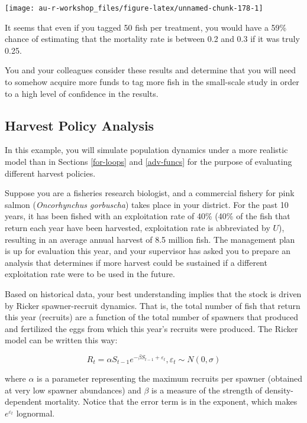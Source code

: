 \documentclass[]{book}
\theoremstyle{definition}
\theoremstyle{definition}
\theoremstyle{definition}
\theoremstyle{remark}
\begin{document}
\begin{center}\texttt{[image: au-r-workshop\_files/figure-latex/unnamed-chunk-178-1]} \end{center}

It seems that even if you tagged 50 fish per treatment, you would have a
59\% chance of estimating that the mortality rate is between 0.2 and 0.3
if it was truly 0.25.

You and your colleagues consider these results and determine that you
will need to somehow acquire more funds to tag more fish in the
small-scale study in order to a high level of confidence in the results.

\subsection{Harvest Policy Analysis}\label{harv-ex}

In this example, you will simulate population dynamics under a more
realistic model than in Sections \ref{for-loops} and \ref{adv-funcs} for
the purpose of evaluating different harvest policies.

Suppose you are a fisheries research biologist, and a commercial fishery
for pink salmon (\emph{Oncorhynchus gorbuscha}) takes place in your
district. For the past 10 years, it has been fished with an exploitation
rate of 40\% (40\% of the fish that return each year have been
harvested, exploitation rate is abbreviated by \(U\)), resulting in an
average annual harvest of 8.5 million fish. The management plan is up
for evaluation this year, and your supervisor has asked you to prepare
an analysis that determines if more harvest could be sustained if a
different exploitation rate were to be used in the future.

Based on historical data, your best understanding implies that the stock
is driven by Ricker spawner-recruit dynamics. That is, the total number
of fish that return this year (recruits) are a function of the total
number of spawners that produced and fertilized the eggs from which this
year's recruits were produced. The Ricker model can be written this way:

\begin{equation}
  R_t = \alpha S_{t-1} e^{-\beta S_{t-1} + \varepsilon_t} ,\varepsilon_t \sim N(0,\sigma)
\label{eq:ricker-ch4}
\end{equation}

where \(\alpha\) is a parameter representing the maximum recruits per
spawner (obtained at very low spawner abundances) and \(\beta\) is a
measure of the strength of density-dependent mortality. Notice that the
error term is in the exponent, which makes \(e^{\varepsilon_t}\)
lognormal.
\end{document}
